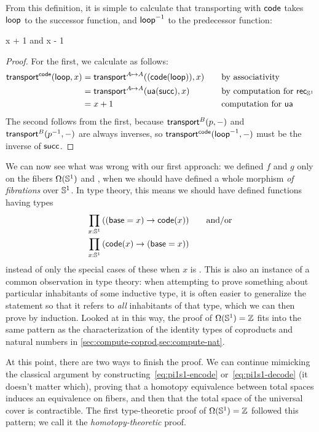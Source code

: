 From this definition, it is simple to calculate that transporting with
$\mathsf{code}$ takes $\mathsf{loop}$ to the successor function, and 
$\mathord{{\mathsf{loop}}^{-1}}$ to the predecessor function:
\begin{lem} \label{lem:transport-s1-code}
 {x + 1} and 
 {x - 1}
\end{lem}
\begin{proof}
For the first, we calculate as follows:
\begin{alignat*}{2}
{\ensuremath{\mathsf{transport}^{\mathsf{code}}(\mathsf{loop},x)}} 
&= \mathsf{transport}^{A \mapsto A}(({\mathsf{code}}\mathopen{}\left({\mathsf{loop}}\right)\mathclose{}),x) &&\quad\text{by associativity}\\
&= \mathsf{transport}^{A \mapsto A}(\mathsf{ua} (\mathsf{succ}),x) &&\quad\text{by computation for $\mathsf{rec}_{\mathbb{S}^1}$}\\
&= x + 1 &&\quad\text{computation for \ensuremath{\mathsf{ua}}}
\end{alignat*}
The second follows from the first, because $\mathsf{transport}^{B}(p,-)$  and ${\mathsf{transport}^{B}(\mathord{{p}^{-1}},-)}$ are always inverses, so ${\mathsf{transport}^{\mathsf{code}}(\mathord{{\mathsf{loop}}^{-1}},-)}$ must be the inverse of $\mathsf{succ}$.
\end{proof}

We can now see what was wrong with our first approach: we defined $f$ and $g$ only on the fibers $\Omega(\mathbb{S}^1)$ and \Z, when we should have defined a whole morphism \emph{of fibrations} over $\mathbb{S}^1$.
In type theory, this means we should have defined functions having types
\begin{align}
  \prd{x:\Sn^1} &((\base=x) \to \code(x)) \qquad\text{and/or} \label{eq:pi1s1-encode}\\
  \prd{x:\Sn^1} &(\code(x) \to (\base=x))\label{eq:pi1s1-decode}
\end{align}
instead of only the special cases of these when $x$ is \base.
This is also an instance of a common observation in type theory: when attempting to prove something about particular inhabitants of some inductive type, it is often easier to generalize the statement so that it refers to \emph{all} inhabitants of that type, which we can then prove by induction.
Looked at in this way, the proof of $\Omega(\mathbb{S}^1)=\mathbb{Z}$ fits into the same pattern as the characterization of the identity types of coproducts and natural numbers in \autoref{sec:compute-coprod,sec:compute-nat}.

At this point, there are two ways to finish the proof.
We can continue mimicking the classical argument by constructing~\eqref{eq:pi1s1-encode} or~\eqref{eq:pi1s1-decode} (it doesn't matter which), proving that a homotopy equivalence between total spaces induces an equivalence on fibers, and then that the total space of the universal cover is contractible.
The first type-theoretic proof of $\Omega(\mathbb{S}^1)=\mathbb{Z}$ followed this pattern; we call it the \emph{homotopy-theoretic} proof.

